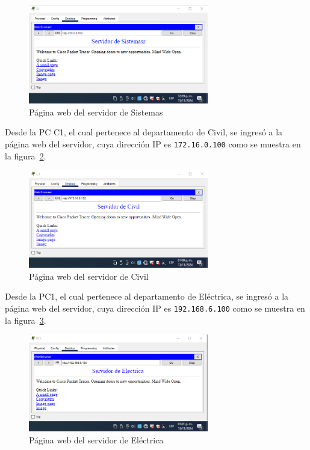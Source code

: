         \begin{figure}[H]
            \centering
            \includegraphics[width=0.7\textwidth]{img/servidor_sistemaPC1.png}
            \caption{Página web del servidor de Sistemas}
            \label{fig:servidor_sistemas_PC1}
        \end{figure}

        Desde la PC C1, el cual pertenece al departamento de Civil, se ingresó a la página web del servidor, cuya dirección IP es \texttt{172.16.0.100} como se muestra en la figura~\ref{fig:servidor_civil_PC1}.

        \begin{figure}[H]
            \centering
            \includegraphics[width=0.7\textwidth]{img/servidor_civil_PC1.png}
            \caption{Página web del servidor de Civil}
            \label{fig:servidor_civil_PC1}
        \end{figure}

        Desde la PC1, el cual pertenece al departamento de Eléctrica, se ingresó a la página web del servidor, cuya dirección IP es \texttt{192.168.6.100} como se muestra en la figura~\ref{fig:servidor_electrica_PC1}.

        \begin{figure}[H]
            \centering
            \includegraphics[width=0.7\textwidth]{img/servidor_electrica_PC1.png}
            \caption{Página web del servidor de Eléctrica}
            \label{fig:servidor_electrica_PC1}
        \end{figure}

